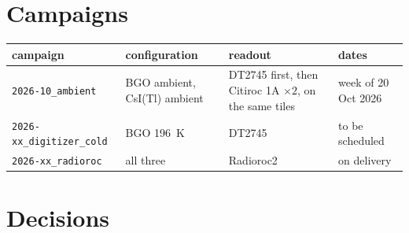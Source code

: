 \documentclass[11pt]{article}
\newcommand{\code}[1]{\texttt{#1}}
\newcommand{\csitl}{CsI(Tl)\xspace}
\begin{document}
\section{Campaigns}

\begin{tabular}{p{} p{} p{} p{}}
\toprule
campaign & configuration & readout & dates \\
\midrule
\code{2026-10\_ambient} & BGO ambient, \csitl ambient & DT2745 first, then Citiroc 1A $\times 2$, on the same tiles & week of 20 Oct 2026 \\
\code{2026-xx\_digitizer\_cold} & BGO 196~K & DT2745 & to be scheduled \\
\code{2026-xx\_radioroc} & all three & Radioroc2 & on delivery \\
\bottomrule
\end{tabular}

\section{Decisions}
\end{document}
